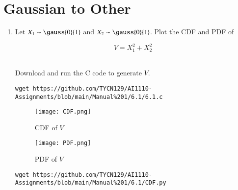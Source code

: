 \documentclass[journal,12pt,twocolumn]{IEEEtran}
\renewcommand\thesection{\arabic{section}}
\begin{document}
\section{Gaussian to Other}
\begin{enumerate}[label=\thesection.\arabic*
,ref=\thesection.\theenumi]
\item
Let $X_1 \sim  \gauss{0}{1}$ and $X_2 \sim  \gauss{0}{1}$. Plot the CDF and PDF of

\begin{equation}
V = X_1^2 + X_2^2
\end{equation}

\solution\\
Download and run the C code to generate $V$.
\begin{lstlisting}
wget https://github.com/TYCN129/AI1110-Assignments/blob/main/Manual%201/6.1/6.1.c
\end{lstlisting}

\begin{figure}[h!]
    \centering
    \texttt{[image: CDF.png]}
    \caption{CDF of $V$}
    \label{fig:my_label}
\end{figure}
\begin{figure}[H]
    \centering
    \texttt{[image: PDF.png]}
    \caption{PDF of $V$}
    \label{fig:my_label}
\end{figure}
\begin{lstlisting}
wget https://github.com/TYCN129/AI1110-Assignments/blob/main/Manual%201/6.1/CDF.py


\end{lstlisting}
\end{enumerate}
\end{document}
